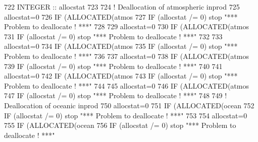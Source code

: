 \begin{DoxyCode}
722     \textcolor{keywordtype}{INTEGER} :: allocstat 
723 
724     \textcolor{comment}{! Deallocation of atmospheric inprod}
725     allocstat=0
726     \textcolor{keywordflow}{IF} (\textcolor{keyword}{ALLOCATED}(atmos%
727     \textcolor{keywordflow}{IF} (allocstat /= 0)  stop \textcolor{stringliteral}{"*** Problem to deallocate ! ***"}
728 
729     allocstat=0
730     \textcolor{keywordflow}{IF} (\textcolor{keyword}{ALLOCATED}(atmos%
731     \textcolor{keywordflow}{IF} (allocstat /= 0)  stop \textcolor{stringliteral}{"*** Problem to deallocate ! ***"}
732 
733     allocstat=0
734     \textcolor{keywordflow}{IF} (\textcolor{keyword}{ALLOCATED}(atmos%
735     \textcolor{keywordflow}{IF} (allocstat /= 0)  stop \textcolor{stringliteral}{"*** Problem to deallocate ! ***"}
736 
737     allocstat=0
738     \textcolor{keywordflow}{IF} (\textcolor{keyword}{ALLOCATED}(atmos%
739     \textcolor{keywordflow}{IF} (allocstat /= 0)  stop \textcolor{stringliteral}{"*** Problem to deallocate ! ***"}
740 
741     allocstat=0
742     \textcolor{keywordflow}{IF} (\textcolor{keyword}{ALLOCATED}(atmos%
743     \textcolor{keywordflow}{IF} (allocstat /= 0)  stop \textcolor{stringliteral}{"*** Problem to deallocate ! ***"}
744 
745     allocstat=0
746     \textcolor{keywordflow}{IF} (\textcolor{keyword}{ALLOCATED}(atmos%
747     \textcolor{keywordflow}{IF} (allocstat /= 0)  stop \textcolor{stringliteral}{"*** Problem to deallocate ! ***"}
748 
749     \textcolor{comment}{! Deallocation of oceanic inprod}
750     allocstat=0
751     \textcolor{keywordflow}{IF} (\textcolor{keyword}{ALLOCATED}(ocean%
752     \textcolor{keywordflow}{IF} (allocstat /= 0)  stop \textcolor{stringliteral}{"*** Problem to deallocate ! ***"}
753 
754     allocstat=0
755     \textcolor{keywordflow}{IF} (\textcolor{keyword}{ALLOCATED}(ocean%
756     \textcolor{keywordflow}{IF} (allocstat /= 0)  stop \textcolor{stringliteral}{"*** Problem to deallocate ! ***"}

\end{DoxyCode}
